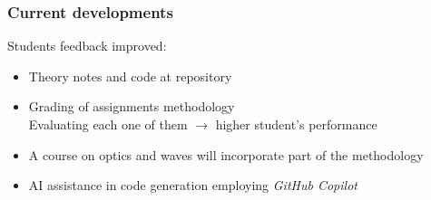 \documentclass[aspectratio=169]{beamer}
\begin{document}
\begin{frame}
	\frametitle{Current developments}
	\pause
	\begin{block}{}
		\begin{description}[<+->]
			\item [2023] Students feedback improved:
				\begin{itemize}
					\item Theory notes and code at repository
					\item Grading of assignments methodology\\
							Evaluating each one of them \(\rightarrow\) higher student's performance
				\end{itemize}
			\item [2024]
				\begin{itemize}
					\item A course on optics and waves will incorporate part of the methodology
					\item AI assistance in code generation employing \emph{GitHub Copilot}
				\end{itemize}
		\end{description}
	\end{block}
\end{frame}
\end{document}
